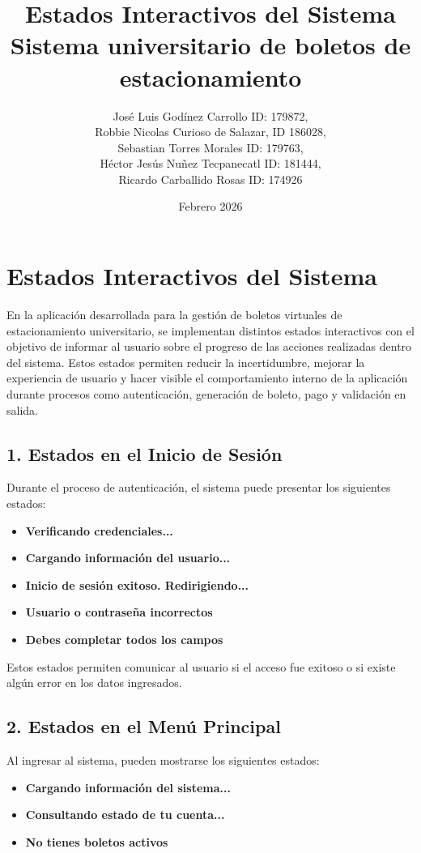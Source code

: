 \documentclass[12pt]{article}
\title{\textbf{Estados Interactivos del Sistema}\\
Sistema universitario de boletos de estacionamiento}
\author{ José Luis Godínez Carrollo ID: 179872, \\
Robbie Nicolas Curioso de Salazar, ID 186028,\\
Sebastian Torres Morales ID: 179763,\\
Héctor Jesús Nuñez Tecpanecatl ID: 181444,\\
Ricardo Carballido Rosas ID: 174926
}
\date{Febrero 2026}
\begin{document}
\maketitle
\thispagestyle{empty}
\newpage

\section{Estados Interactivos del Sistema}

En la aplicación desarrollada para la gestión de boletos virtuales de estacionamiento universitario, se implementan distintos estados interactivos con el objetivo de informar al usuario sobre el progreso de las acciones realizadas dentro del sistema. Estos estados permiten reducir la incertidumbre, mejorar la experiencia de usuario y hacer visible el comportamiento interno de la aplicación durante procesos como autenticación, generación de boleto, pago y validación en salida.

\subsection{1. Estados en el Inicio de Sesión}

Durante el proceso de autenticación, el sistema puede presentar los siguientes estados:

\begin{itemize}
    \item \textbf{Verificando credenciales...}
    \item \textbf{Cargando información del usuario...}
    \item \textbf{Inicio de sesión exitoso. Redirigiendo...}
    \item \textbf{Usuario o contraseña incorrectos}
    \item \textbf{Debes completar todos los campos}
\end{itemize}

Estos estados permiten comunicar al usuario si el acceso fue exitoso o si existe algún error en los datos ingresados.

\subsection{2. Estados en el Menú Principal}

Al ingresar al sistema, pueden mostrarse los siguientes estados:

\begin{itemize}
    \item \textbf{Cargando información del sistema...}
    \item \textbf{Consultando estado de tu cuenta...}
    \item \textbf{No tienes boletos activos}
\end{itemize}
\end{document}
